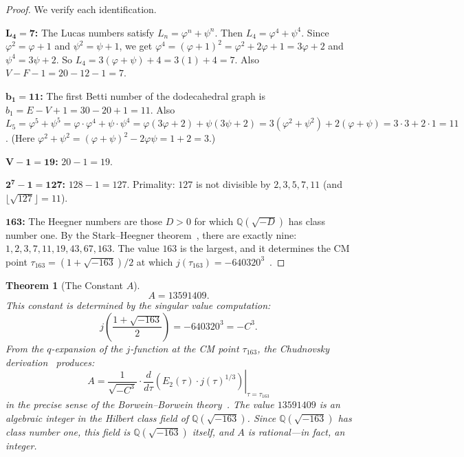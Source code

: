 \documentclass[11pt,a4paper]{article}
\theoremstyle{plain}
\newtheorem{theorem}{Theorem}[section]
\theoremstyle{definition}
\begin{document}
\begin{proof}
We verify each identification.

\textbf{$\boldsymbol{L_4 = 7}$:} The Lucas numbers satisfy $L_n = \varphi^n + \psi^n$.
Then $L_4 = \varphi^4 + \psi^4$.
Since $\varphi^2 = \varphi + 1$ and $\psi^2 = \psi + 1$,
we get $\varphi^4 = (\varphi + 1)^2 = \varphi^2 + 2\varphi + 1 = 3\varphi + 2$
and $\psi^4 = 3\psi + 2$.
So $L_4 = 3(\varphi + \psi) + 4 = 3(1) + 4 = 7$.
Also $V - F - 1 = 20 - 12 - 1 = 7$. \checkmark

\textbf{$\boldsymbol{b_1 = 11}$:} The first Betti number of the dodecahedral graph is
$b_1 = E - V + 1 = 30 - 20 + 1 = 11$.
Also $L_5 = \varphi^5 + \psi^5 = \varphi \cdot \varphi^4 + \psi \cdot \psi^4
= \varphi(3\varphi + 2) + \psi(3\psi + 2)
= 3(\varphi^2 + \psi^2) + 2(\varphi + \psi)
= 3 \cdot 3 + 2 \cdot 1 = 11$.
(Here $\varphi^2 + \psi^2 = (\varphi + \psi)^2 - 2\varphi\psi = 1 + 2 = 3$.) \checkmark

\textbf{$\boldsymbol{V - 1 = 19}$:} $20 - 1 = 19$. \checkmark

\textbf{$\boldsymbol{2^7 - 1 = 127}$:} $128 - 1 = 127$. Primality: $127$ is not
divisible by $2, 3, 5, 7, 11$ (and $\lfloor\sqrt{127}\rfloor = 11$). \checkmark

\textbf{$\boldsymbol{163}$:} The Heegner numbers are those $D > 0$ for which
$\mathbb{Q}(\sqrt{-D})$ has class number one. By the
Stark--Heegner theorem~\cite{stark1967},
there are exactly nine: $1, 2, 3, 7, 11, 19, 43, 67, 163$.
The value $163$ is the largest, and it determines the CM point
$\tau_{163} = (1 + \sqrt{-163})/2$ at which
$j(\tau_{163}) = -640320^3$~\cite{chudnovsky1989}.
\end{proof}

\begin{theorem}[The Constant $A$]\label{thm:A}
\begin{equation}\label{eq:A-value}
  A = 13591409.
\end{equation}
This constant is determined by the singular value computation:
\begin{equation}\label{eq:j-relation}
  j\!\left(\frac{1+\sqrt{-163}}{2}\right) = -640320^3 = -C^3.
\end{equation}
From the $q$-expansion of the $j$-function at the CM point $\tau_{163}$,
the Chudnovsky derivation~\cite{chudnovsky1989} produces:
\begin{equation}\label{eq:A-from-j}
  A = \frac{1}{\sqrt{-C^3}} \cdot \left.\frac{d}{d\tau}\!\left(
  E_2(\tau) \cdot j(\tau)^{1/3}\right)\right|_{\tau = \tau_{163}}
\end{equation}
in the precise sense of the Borwein--Borwein
theory~\cite{borwein1987}. The value $13591409$ is an algebraic integer
in the Hilbert class field of $\mathbb{Q}(\sqrt{-163})$.
Since $\mathbb{Q}(\sqrt{-163})$ has class number one, this field is
$\mathbb{Q}(\sqrt{-163})$ itself, and $A$ is rational---in fact, an integer.
\end{theorem}
\end{document}
